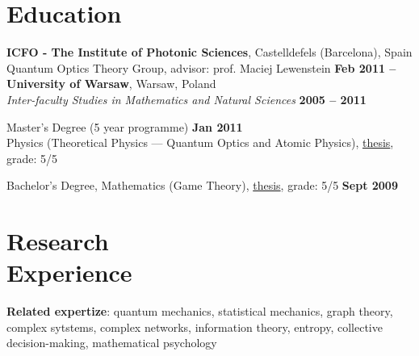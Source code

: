 \documentclass[margin,line]{resume}
\begin{document}
\begin{resume}

    \section{\mysidestyle Education}
    
    {\bf ICFO - The Institute of Photonic Sciences},  Castelldefels (Barcelona), Spain \\%
    Quantum Optics Theory Group, advisor: prof. Maciej Lewenstein \hfill {\bf Feb 2011 -- }\\

    {\bf University of Warsaw}, Warsaw, Poland \\
    {\sl Inter-faculty Studies in Mathematics and Natural Sciences} \hfill {\bf 2005 -- 2011}\\
    \begin{list2}
      \vspace*{-4mm}
      \item Master's Degree  (5 year programme) \hfill {\bf Jan 2011}\\
      Physics (Theoretical Physics --- Quantum Optics and Atomic Physics),
      \href{http://migdal.wikidot.com/en:collective-decoherence}{thesis}, grade: 5/5
      \item Bachelor's Degree, Mathematics (Game Theory),
      \href{http://migdal.wikidot.com/en:mafia}{thesis}, grade: 5/5 \hfill {\bf Sept 2009}
    \end{list2}
    

    \section{\mysidestyle Research\\Experience}

    \begin{list2}
    \item {\bf Related expertize}: quantum mechanics, statistical mechanics, graph theory, complex sytstems, complex networks, information theory, entropy, collective decision-making, mathematical psychology


\end{list2}
\end{resume}
\end{document}

